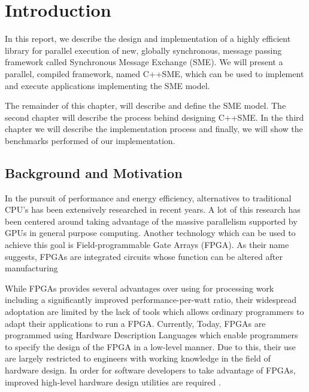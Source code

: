 \chapter{Introduction}

In this report, we describe the design and implementation of a highly
efficient library for parallel execution of new, globally synchronous,
message passing framework called Synchronous Message Exchange
(SME). We will present a parallel, compiled framework, named
C++SME, which can be used to implement and execute applications
implementing the SME model.

The remainder of this chapter, will describe and define the SME
model. The second chapter will describe the process behind designing
C++SME. In the third chapter we will describe the implementation
process and finally, we will show the benchmarks performed of our
implementation.


\section{Background and Motivation}
In the pursuit of performance and energy efficiency, alternatives to
traditional CPU's has been extensively researched in recent years. A
lot of this research has been centered around taking advantage of the
massive parallelism supported by GPUs in general purpose
computing. Another technology which can be used to achieve this goal
is Field-programmable Gate Arrays (FPGA). As their name suggests,
FPGAs are integrated circuits whose function can be altered after
manufacturing

While FPGAs provides several advantages over using for processing work
including a significantly improved performance-per-watt ratio, their
widespread adoptation are limited by the lack
of tools which allows ordinary programmers to adapt their applications
to run a FPGA. Currently, Today, FPGAs are programmed using Hardware
Description Languages which enable programmers to specify the design
of the FPGA in a low-level manner. Due to this, their use are largely
restricted to engineers with working knowledge in the field of
hardware design. In order for software developers to take advantage of
FPGAs, improved high-level hardware design utilities are required
\cite{bacon2013fpga}.

